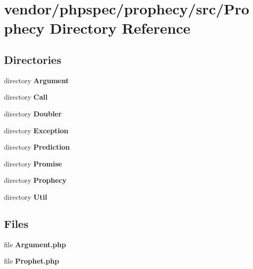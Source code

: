 \section{vendor/phpspec/prophecy/src/\+Prophecy Directory Reference}
\label{dir_ed64ae5d3dc8b30b9d59300afbb69775}
\subsection*{Directories}
\begin{DoxyCompactItemize}
\item 
directory {\bf Argument}
\item 
directory {\bf Call}
\item 
directory {\bf Doubler}
\item 
directory {\bf Exception}
\item 
directory {\bf Prediction}
\item 
directory {\bf Promise}
\item 
directory {\bf Prophecy}
\item 
directory {\bf Util}
\end{DoxyCompactItemize}
\subsection*{Files}
\begin{DoxyCompactItemize}
\item 
file {\bf Argument.\+php}
\item 
file {\bf Prophet.\+php}
\end{DoxyCompactItemize}
